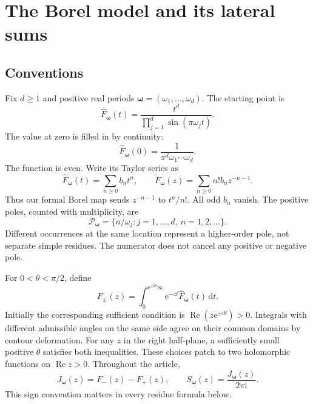 \documentclass[11pt,a4paper]{article}
\numberwithin{equation}{section}
\theoremstyle{definition}
\theoremstyle{remark}
\newcommand{\ii}{\mathrm i}
\newcommand{\e}{\mathrm e}
\newcommand{\dd}{\,\mathrm d}
\newcommand{\re}{\operatorname{Re}}
\newcommand{\bw}{\boldsymbol\omega}
\begin{document}
\section{The Borel model and its lateral sums}
\label{sec:borel}

\subsection{Conventions}
Fix $d\ge1$ and positive real periods $\bw=(\omega_1,\ldots,\omega_d)$.
The starting point is
\begin{equation}
 \widehat F_{\bw}(t)=
 \frac{t^d}{\prod_{j=1}^{d}\sin(\pi\omega_jt)}.
 \label{eq:kernel}
\end{equation}
The value at zero is filled in by continuity:
\[
 \widehat F_{\bw}(0)=\frac1{\pi^d\omega_1\cdots\omega_d}.
\]
The function is even. Write its Taylor series as
\begin{equation}
 \widehat F_{\bw}(t)=\sum_{n\ge0}b_n t^n,
 \qquad
 \widetilde F_{\bw}(z)=\sum_{n\ge0}n!b_n z^{-n-1}.
 \label{eq:borel-convention}
\end{equation}
Thus our formal Borel map sends $z^{-n-1}$ to $t^n/n!$.
All odd $b_n$ vanish. The positive poles, counted with multiplicity, are
\begin{equation}
 \mathcal P_{\bw}=\{n/\omega_j:j=1,\ldots,d,\ n=1,2,\ldots\}.
 \label{eq:poles}
\end{equation}
Different occurrences at the same location represent a higher-order pole,
not separate simple residues. The numerator does not cancel any positive
or negative pole.

For $0<\theta<\pi/2$, define
\begin{equation}
 F_\pm(z)=\int_0^{\e^{\pm\ii\theta}\infty}
       \e^{-zt}\widehat F_{\bw}(t)\dd t.
 \label{eq:lateral}
\end{equation}
Initially the corresponding sufficient condition is
$\re(z\e^{\pm\ii\theta})>0$. Integrals with different admissible angles
on the same side agree on their common domains by contour deformation.
For any $z$ in the right half-plane, a sufficiently small positive
$\theta$ satisfies both inequalities. These choices patch to two
holomorphic functions on $\re z>0$. Throughout the article,
\begin{equation}
 J_{\bw}(z)=F_-(z)-F_+(z),
 \qquad S_{\bw}(z)=\frac{J_{\bw}(z)}{2\pi\ii}.
 \label{eq:jump-sign}
\end{equation}
This sign convention matters in every residue formula below.
\end{document}
